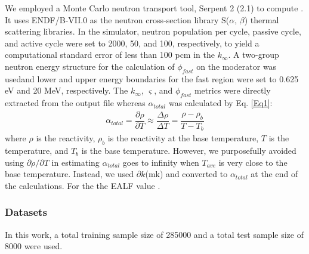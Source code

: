     We employed a Monte Carlo neutron transport tool, Serpent 2 (2.1\DIFdelbegin {}\DIFdelend \DIFaddbegin {}\DIFaddend ) \cite{Lep2014} to compute \DIFdelbegin {}\DIFdelend \DIFaddbegin {}\DIFaddend . It uses ENDF/B-VII.0 \cite{chadwick2006} as the neutron cross-section library \DIFdelbegin {}\DIFdelend \DIFaddbegin {}\DIFaddend S(${\alpha}$, ${\beta}$) thermal scattering libraries. In the simulator, neutron population per cycle, passive cycle, and active cycle were set to 2000, 50, and 100, respectively, to yield a computational standard error of less than 100 pcm in the $k_{\infty}$. A two-group neutron energy structure for the calculation of $\phi_{fast}$ on the moderator was used\DIFaddbegin \DIFadd{, }\DIFaddend and lower and upper energy boundaries for the fast region were set to 0.625 eV and 20 MeV, respectively. The $k_{\infty}$, $\varsigma$, and $\phi_{fast}$ metrics were directly extracted from the output file whereas ${\alpha_{total}}$ was calculated by Eq. \protect\ref{Eq1}:
    \begin{eqnarray}\label{Eq1}
    \alpha_{total} = \dfrac{\partial\rho}{\partial T} \approx
    \dfrac{\Delta\rho}{\Delta T}=\dfrac{\rho-\rho_b}{T-T_b}
    \end{eqnarray}
    where $\rho$ is the reactivity, $\rho_b$ is the reactivity at the base temperature, $T$ is the temperature, and $T_b$ is the base temperature. However, we purposefully avoided using $\partial \rho /\partial T$ in estimating \DIFdelbegin {}\DIFdelend \DIFaddbegin {}\DIFaddend ${\alpha_{total}}$ \DIFaddbegin {}\DIFaddend goes to infinity when $T_{ave}$ is very close to the base temperature\DIFdelbegin {}\DIFdelend . Instead, we used $\partial k$(mk) and converted to ${\alpha_{total}}$ at the end of the calculations. For the \DIFdelbegin {}\DIFdelend \DIFaddbegin {}\DIFaddend the \gls{EALF}  value \DIFdelbegin {}\DIFdelend \DIFaddbegin {}\DIFaddend .

\subsubsection{Datasets}
    In this work, a total training sample size of 285000 and a total test sample
    size of 8000 were used.



